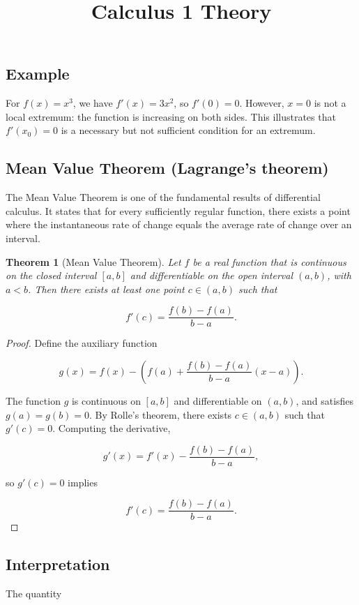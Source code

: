 \documentclass[11pt,a4paper]{article} \usepackage[T1]{fontenc}
\theoremstyle{plain} \newtheorem{theorem}{Theorem} \title{Calculus 1 Theory}
\begin{document}
\subsection*{Example}

For $f(x)=x^3$, we have $f'(x)=3x^2$, so $f'(0)=0$. However, $x=0$ is not a
local extremum: the function is increasing on both sides. This illustrates that
$f'(x_0)=0$ is a necessary but not sufficient condition for an extremum.

\subsection {Mean Value Theorem (Lagrange's theorem)}

The Mean Value Theorem is one of the fundamental results of differential
calculus. It states that for every sufficiently regular function, there exists
a point where the instantaneous rate of change equals the average rate of
change over an interval.

\begin{theorem}
[Mean Value Theorem] Let $f$ be a real function that is continuous on the
closed interval $[a,b]$ and differentiable on the open interval $(a,b)$, with
$a<b$. Then there exists at least one point $c\in(a,b)$ such that

\[
f'(c) = \frac{f(b)-f(a)}{b-a}.
\]

\end{theorem}

\begin{proof}
Define the auxiliary function

\[
g(x) = f(x) - \left( f(a) + \frac{f(b)-f(a)}{b-a}(x-a) \right).
\]

The function $g$ is continuous on $[a,b]$ and differentiable on $(a,b)$, and
satisfies $g(a)=g(b)=0$. By Rolle's theorem, there exists $c\in(a,b)$ such that
$g'(c)=0$. Computing the derivative,

\[
g'(x) = f'(x) - \frac{f(b)-f(a)}{b-a},
\]

so $g'(c)=0$ implies

\[
f'(c) = \frac{f(b)-f(a)}{b-a}.
\]

\end{proof}

\subsection*{Interpretation}

The quantity
\end{document}
